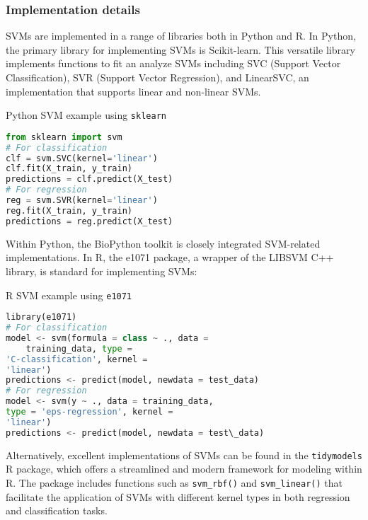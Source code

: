 \subsubsection{Implementation details}

SVMs are implemented in a range of libraries both in Python and R. In
Python, the primary library for implementing SVMs is Scikit-learn. This
versatile library implements functions to fit an analyze SVMs including
SVC (Support Vector Classification), SVR (Support Vector Regression),
and LinearSVC, an implementation that supports linear and non-linear
SVMs.

\begin{algorithm}
	\caption{Python SVM example using \texttt{sklearn}}\label{alg:svm_py}
\begin{lstlisting}[language=Python]
from sklearn import svm
# For classification
clf = svm.SVC(kernel='linear')
clf.fit(X_train, y_train)
predictions = clf.predict(X_test)
# For regression
reg = svm.SVR(kernel='linear')
reg.fit(X_train, y_train)
predictions = reg.predict(X_test)
\end{lstlisting}
\end{algorithm}


Within Python, the BioPython toolkit is closely integrated
SVM-related implementations. In R, the e1071 package, a wrapper of
the LIBSVM C++ library, is standard for implementing SVMs:

\begin{algorithm}
\caption{R SVM example using \texttt{e1071}}\label{alg:svm_r}
\begin{lstlisting}[language=Python]
library(e1071)
# For classification
model <- svm(formula = class ~ ., data =
    training_data, type =
'C-classification', kernel =
'linear')
predictions <- predict(model, newdata = test_data)
# For regression
model <- svm(y ~ ., data = training_data,
type = 'eps-regression', kernel =
'linear')
predictions <- predict(model, newdata = test\_data)
\end{lstlisting}
\end{algorithm}

Alternatively, excellent implementations of SVMs can be found in the
\texttt{tidymodels} R package, which offers a streamlined and modern framework
for modeling within R. The package includes functions such as
\texttt{svm\_rbf()} and \texttt{svm\_linear()} that facilitate the application of SVMs
with different kernel types in both regression and classification
tasks.

